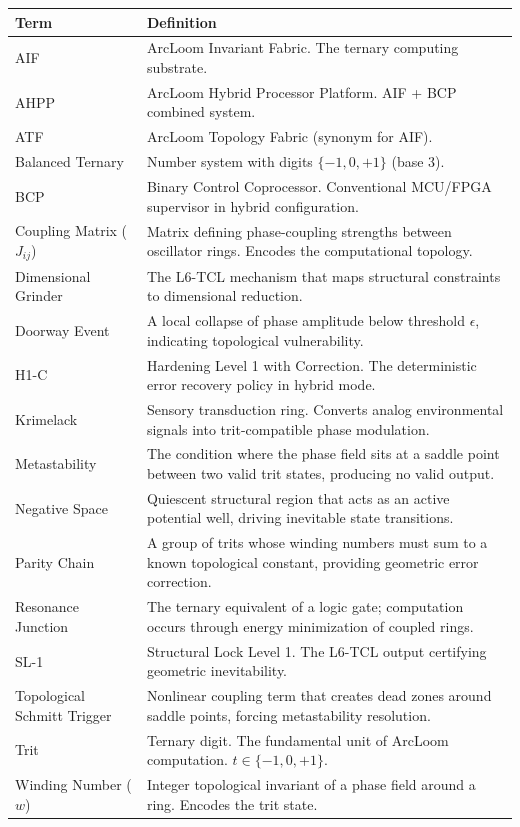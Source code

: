 \documentclass[11pt, a4paper]{article}
\begin{document}
\begin{longtable}{@{}p{4cm}p{10.5cm}@{}}
\toprule
\textbf{Term} & \textbf{Definition} \\
\midrule
\endhead
AIF & ArcLoom Invariant Fabric. The ternary computing substrate. \\
AHPP & ArcLoom Hybrid Processor Platform. AIF + BCP combined system. \\
ATF & ArcLoom Topology Fabric (synonym for AIF). \\
Balanced Ternary & Number system with digits $\{-1, 0, +1\}$ (base 3). \\
BCP & Binary Control Coprocessor. Conventional MCU/FPGA supervisor in
      hybrid configuration. \\
Coupling Matrix ($J_{ij}$) & Matrix defining phase-coupling strengths between
                             oscillator rings. Encodes the computational
                             topology. \\
Dimensional Grinder & The L6-TCL mechanism that maps structural constraints
                      to dimensional reduction. \\
Doorway Event & A local collapse of phase amplitude below threshold $\epsilon$,
                indicating topological vulnerability. \\
H1-C & Hardening Level 1 with Correction. The deterministic error recovery
       policy in hybrid mode. \\
Krimelack & Sensory transduction ring. Converts analog environmental signals
            into trit-compatible phase modulation. \\
Metastability & The condition where the phase field sits at a saddle point
                between two valid trit states, producing no valid output. \\
Negative Space & Quiescent structural region that acts as an active potential
                 well, driving inevitable state transitions. \\
Parity Chain & A group of trits whose winding numbers must sum to a known
               topological constant, providing geometric error correction. \\
Resonance Junction & The ternary equivalent of a logic gate; computation
                     occurs through energy minimization of coupled rings. \\
SL-1 & Structural Lock Level 1. The L6-TCL output certifying geometric
       inevitability. \\
Topological Schmitt Trigger & Nonlinear coupling term that creates dead zones
                              around saddle points, forcing metastability
                              resolution. \\
Trit & Ternary digit. The fundamental unit of ArcLoom computation.
      $t \in \{-1, 0, +1\}$. \\
Winding Number ($w$) & Integer topological invariant of a phase field around
                       a ring. Encodes the trit state. \\
\bottomrule
\end{longtable}
\end{document}
